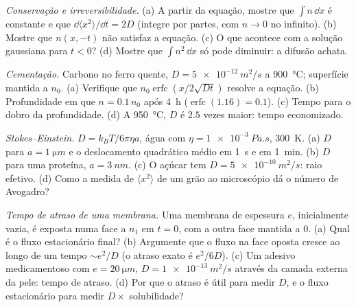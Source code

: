 \begin{exercise}[$\star\star$]\label{exo:b2:particle-diffusion:7}
\emph{Conservação e irreversibilidade.} (a) A partir da equação, mostre
que $\int n\,\dd x$ é constante e que $\dd\langle x^2\rangle/\dd t =
2D$ (integre por partes, com $n \to 0$ no infinito). (b) Mostre que
$n(x,-t)$ não satisfaz a equação. (c) O que acontece com a
solução gaussiana para $t < 0$? (d) Mostre que $\int n^2\,\dd x$ só pode
diminuir: a difusão achata.
\end{exercise}

\begin{exercise}[$\star\star$]\label{exo:b2:particle-diffusion:8}
\emph{Cementação.} Carbono no ferro quente, $D = \qty{5e-12}{m^2/s}$ a
\qty{900}{\celsius}; superfície mantida a $n_0$. (a) Verifique que $n_0
\operatorname{erfc}(x/2\sqrt{Dt})$ resolve a equação. (b) Profundidade em
que $n = 0.1\,n_0$ após \qty{4}{h} ($\operatorname{erfc}(1.16) = 0.1$).
(c) Tempo para o dobro da profundidade. (d) A \qty{950}{\celsius}, $D$ é $2.5$
vezes maior: tempo economizado.
\end{exercise}

\begin{exercise}[$\star\star$]\label{exo:b2:particle-diffusion:9}
\emph{Stokes--Einstein.} $D = k_BT/6\pi\eta a$, água com $\eta =
\qty{1e-3}{Pa.s}$, \qty{300}{K}. (a) $D$ para $a = \qty{1}{\micro m}$ e
o deslocamento quadrático médio em \qty{1}{s} e em \qty{1}{min}. (b) $D$
para uma proteína, $a = \qty{3}{nm}$. (c) O açúcar tem $D = \qty{5e-10}{m^2/s}$:
raio efetivo. (d) Como a medida de $\langle x^2\rangle$ de um grão
ao microscópio dá o número de Avogadro?
\end{exercise}

\begin{exercise}[$\star\star\star$]\label{exo:b2:particle-diffusion:10}
\emph{Tempo de atraso de uma membrana.} Uma membrana de espessura $e$, inicialmente
vazia, é exposta numa face a $n_1$ em $t = 0$, com a outra face mantida
a $0$. (a) Qual é o fluxo estacionário final? (b) Argumente que o fluxo
na face oposta cresce ao longo de um tempo $\sim e^2/D$ (o atraso exato é
$e^2/6D$). (c) Um adesivo medicamentoso com $e = \qty{20}{\micro m}$, $D =
\qty{1e-13}{m^2/s}$ através da camada externa da pele: tempo de atraso. (d) Por que
o atraso é útil para medir $D$, e o fluxo estacionário para medir
$D \times$ solubilidade?
\end{exercise}

